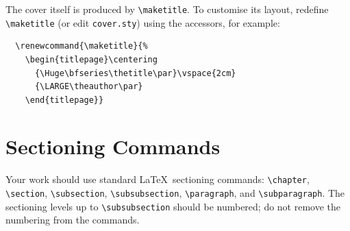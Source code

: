The cover itself is produced by \verb|\maketitle|. To customise its
layout, redefine \verb|\maketitle| (or edit \texttt{cover.sty}) using
the accessors, for example:
\begin{verbatim}
  \renewcommand{\maketitle}{%
    \begin{titlepage}\centering
      {\Huge\bfseries\thetitle\par}\vspace{2cm}
      {\LARGE\theauthor\par}
    \end{titlepage}}
\end{verbatim}

\section{Sectioning Commands}
\label{sec:sectioning}

\sloppy
Your work should use standard \LaTeX\ sectioning commands:
\verb|\chapter|, \verb|\section|, \verb|\subsection|,
\verb|\subsubsection|, \verb|\paragraph|, and \verb|\subparagraph|. The
sectioning levels up to \verb|\subsubsection| should be numbered; do not
remove the numbering from the commands.
\fussy

